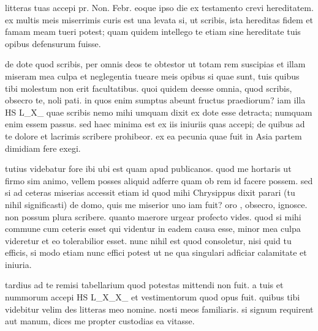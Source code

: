 


 litteras tuas accepi pr. Non. Febr. eoque ipso die ex testamento crevi hereditatem. ex multis meis miserrimis curis est una levata si, ut scribis, ista hereditas fidem et famam meam tueri potest; quam quidem intellego te etiam sine hereditate tuis opibus defensurum fuisse.

 de dote quod scribis, per omnis deos te obtestor ut totam rem suscipias et illam miseram mea culpa et neglegentia tueare meis opibus si quae sunt, tuis quibus tibi molestum non erit facultatibus. quoi quidem deesse omnia, quod scribis, obsecro te, noli pati. in quos enim sumptus abeunt fructus praediorum? iam illa HS L_X_ quae scribis nemo mihi umquam dixit ex dote esse detracta; numquam enim essem passus. sed haec minima est ex iis iniuriis quas accepi; de quibus ad te dolore et lacrimis scribere prohibeor. ex ea pecunia quae fuit in Asia partem dimidiam fere exegi.

 tutius videbatur fore ibi ubi est quam apud publicanos. quod me hortaris ut firmo sim animo, vellem posses aliquid adferre quam ob rem id facere possem. sed si ad ceteras miserias accessit etiam id quod mihi Chrysippus dixit parari (tu nihil significasti) de domo, quis me miserior uno iam fuit? oro , obsecro, ignosce. non possum plura scribere. quanto maerore urgear profecto vides. quod si mihi commune cum ceteris esset qui videntur in eadem causa esse, minor mea culpa videretur et eo tolerabilior esset. nunc nihil est quod consoletur, nisi quid tu efficis, si modo etiam nunc effici potest ut ne qua singulari adficiar calamitate et iniuria.

 tardius ad te remisi tabellarium quod potestas mittendi non fuit. a tuis et nummorum accepi HS L_X_X_ et vestimentorum quod opus fuit. quibus tibi videbitur velim des litteras meo nomine. nosti meos familiaris. si signum requirent aut manum, dices me propter custodias ea vitasse.
